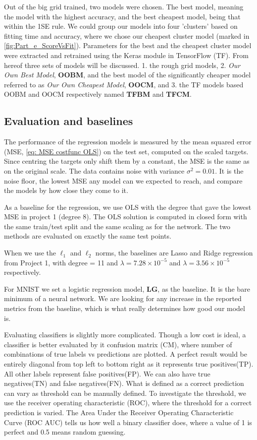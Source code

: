 \documentclass[reprint,english,notitlepage, floatfix]{revtex4-2}  %
\begin{document}
Out of the big grid trained, two models were chosen. The best model, meaning the model with the highest accuracy, and the best cheapest model, being that within the 1SE rule. We could group our models into four 'clusters' based on fitting time and accuracy, where we chose our cheapest cluster model (marked in \cref{fig:Part_e_ScoreVsFit}). Parameters for the best and the cheapest cluster model were extracted and retrained using the Keras module in TensorFlow (TF). From hereof three sets of models will be discussed. 1. the rough grid models, 2. \textit{Our Own Best Model}, \textbf{OOBM}, and the best model of the significantly cheaper model referred to as \textit{Our Own Cheapest Model}, \textbf{OOCM}, and 3. the TF models based OOBM and OOCM respectively named \textbf{TFBM} and \textbf{TFCM}.

\subsection{Evaluation and baselines}

The performance of the regression models is measured by the mean squared error (MSE, \autoref{eq: MSE costfunc OLS}) on the test set, computed on the scaled targets. Since centring the targets only shift them by a constant, the MSE is the same as on the original scale. The data contains noise with variance $\sigma^2 = 0.01$. It is the noise floor, the lowest MSE any model can we expected to reach, and compare the models by how close they come to it. 

As a baseline for the regression, we use OLS with the degree that gave the lowest MSE in project 1 (degree 8). The OLS solution is computed in closed form with the same train/test split and the same scaling as for the network. The two methods are evaluated on exactly the same test points. 

When we use the $\ell_1$ and $\ell_2$ norms, the baselines are Lasso and Ridge regression from Project 1, with degree = 11 and $\lambda = 7.28 \times 10^{-5}$ and $\lambda = 3.56 \times 10^{-5}$ respectively. 

For MNIST we set a logistic regression model, \textbf{LG}, as the baseline. It is the bare minimum of a neural network. We are looking for any increase in the reported metrics from the baseline, which is what really determines how good our model is.

Evaluating classifiers is slightly more complicated. Though a low cost is ideal, a classifier is better evaluated by it confusion matrix (CM), where number of combinations of true labels vs predictions are plotted. A perfect result would be entirely diagonal from top left to bottom right as it represents true positives(TP). All other labels represent false positives(FP). We can also have true negatives(TN) and false negatives(FN). What is defined as a correct prediction can vary as threshold can be manually defined. To investigate the threshold, we use the receiver operating characteristic (ROC), where the threshold for a correct prediction is varied. The Area Under the Receiver Operating Characteristic Curve (ROC AUC) tells us how well a binary classifier does, where a value of 1 is perfect and 0.5 means random guessing\cite{SKlearn_metrics}. 
\end{document}
